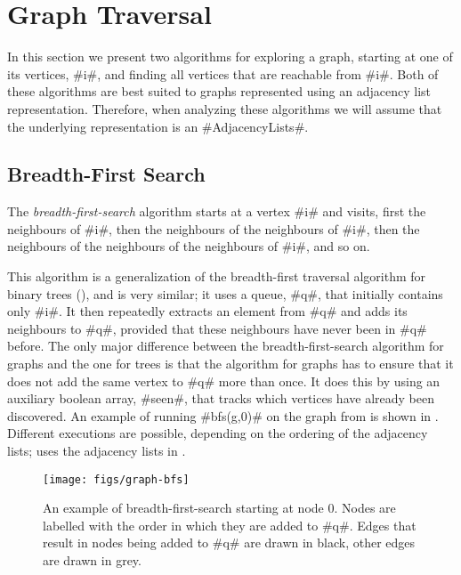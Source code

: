 \section{Graph Traversal}

In this section we present two algorithms for exploring a graph,
starting at one of its vertices, #i#, and finding all vertices that
are reachable from #i#.  Both of these algorithms are best suited to
graphs represented using an adjacency list representation.  Therefore,
when analyzing these algorithms we will assume that the underlying
representation is an #AdjacencyLists#.

\subsection{Breadth-First Search}

%
The \emph{breadth-first-search} algorithm starts at a vertex #i# and visits,
first the neighbours of #i#, then the neighbours of the neighbours of #i#,
then the neighbours of the neighbours of the neighbours of #i#, and so on.

This algorithm is a generalization of the breadth-first traversal
algorithm for binary trees (), and is
very similar; it uses a queue, #q#, that initially contains only #i#.
It then repeatedly extracts an element from #q# and adds its neighbours
to #q#, provided that these neighbours have never been in #q# before.
The only major difference between the breadth-first-search algorithm
for graphs and the one for trees is that the algorithm for graphs has
to ensure that it does not add the same vertex to #q# more than once.
It does this by using an auxiliary boolean array, #seen#, that tracks
which vertices have already been discovered.
An example of running #bfs(g,0)# on the graph from 
is shown in .  Different executions are possible,
depending on the ordering of the adjacency lists; 
uses the adjacency lists in .

\begin{figure}
  \begin{center}
    \texttt{[image: figs/graph-bfs]}
  \end{center}
  \caption[Breadth-first-search]{An example of breadth-first-search starting at node 0. Nodes are
  labelled with the order in which they are added to #q#.  Edges that
  result in nodes being added to #q# are drawn in black, other edges
  are drawn in grey.}
\end{figure}

